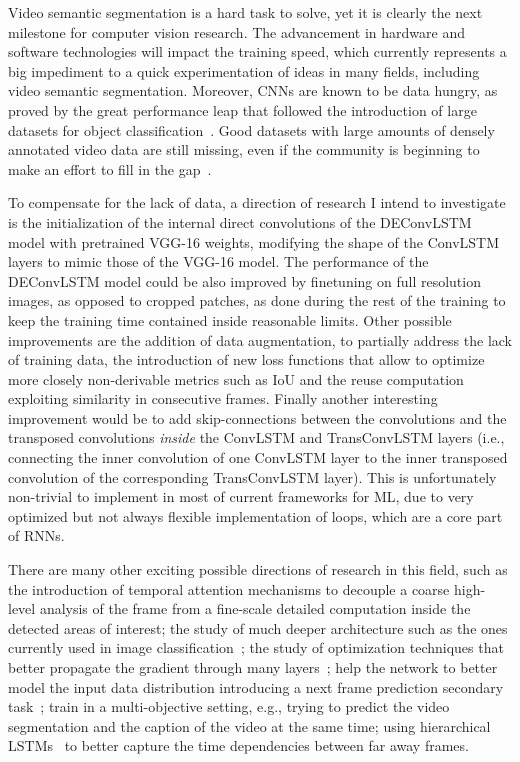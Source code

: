 Video semantic segmentation is a hard task to solve, yet it is clearly the next
milestone for computer vision research. The advancement in hardware and
software technologies will impact the training speed, which currently
represents a big impediment to a quick experimentation of ideas in many fields,
including video semantic segmentation. Moreover, CNNs are known to be data
hungry, as proved by the great performance leap that followed the introduction
of large datasets for object classification~\citep{ILSVRCarxiv14}. Good
datasets with large amounts of densely annotated video data are still missing,
even if the community is beginning to make an effort to fill in the
gap~\citep[see~e.g.,~][]{Perazzi2016,lin2014microsoft}.

To compensate for the lack of data, a direction of research I intend to
investigate is the initialization of the internal direct convolutions of the
DEConvLSTM model with pretrained VGG-16 weights, modifying the shape of the
ConvLSTM layers to mimic those of the VGG-16 model. The performance of the
DEConvLSTM model could be also improved by finetuning on full resolution
images, as opposed to cropped patches, as done during the rest of the training
to keep the training time contained inside reasonable limits. Other possible
improvements are the addition of data augmentation, to partially address the
lack of training data, the introduction of new loss functions that allow to
optimize more closely non-derivable metrics such as IoU and the reuse
computation exploiting similarity in consecutive frames. Finally another
interesting improvement would be to add skip-connections between the
convolutions and the transposed convolutions \emph{inside} the ConvLSTM and
TransConvLSTM layers (i.e., connecting the inner convolution of one ConvLSTM
layer to the inner transposed convolution of the corresponding TransConvLSTM
layer). This is unfortunately non-trivial to implement in most of current
frameworks for ML, due to very optimized but not always flexible implementation
of loops, which are a core part of RNNs.

There are many other exciting possible directions of research in this field,
such as the introduction of temporal attention mechanisms to decouple a coarse
high-level analysis of the frame from a fine-scale detailed computation inside
the detected areas of interest; the study of much deeper architecture such as
the ones currently used in image classification~\citep[see, e.g.,~][]{%
szegedy2016inception,he2015deep}; the study of optimization techniques that
better propagate the gradient through many layers~\citep[see,
e.g.,~][]{he2015deep,huang2016deep,gulcehre2016mollifying}; help the network to
better model the input data distribution introducing a next frame prediction
secondary task~\citep[see, e.g.,~][]{mahjourian2016geometry}; train in a
multi-objective setting, e.g., trying to predict the video segmentation and the
caption of the video at the same time; using hierarchical LSTMs~\citep[see,
e.g.,~][]{Koutnik-et-al-ICML2014,chung2016hierarchical} to better capture the
time dependencies between far away frames.
